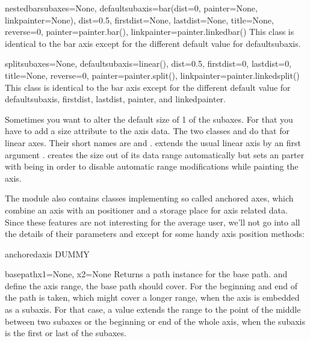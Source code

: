 \begin{classdesc}{nestedbar}{subaxes=None,
                             defaultsubaxis=bar(dist=0, painter=None, linkpainter=None),
                             dist=0.5, firstdist=None, lastdist=None,
                             title=None, reverse=0,
                             painter=painter.bar(),
                             linkpainter=painter.linkedbar()}
   This class is identical to the bar axis except for the different
   default value for defaultsubaxis.
\end{classdesc}

\begin{classdesc}{split}{subaxes=None,
                         defaultsubaxis=linear(),
                         dist=0.5, firstdist=0, lastdist=0,
                         title=None, reverse=0,
                         painter=painter.split(),
                         linkpainter=painter.linkedsplit()}
   This class is identical to the bar axis except for the different
   default value for defaultsubaxis, firstdist, lastdist, painter, and
   linkedpainter.
\end{classdesc}

Sometimes you want to alter the default size of 1 of the subaxes. For
that you have to add a size attribute to the axis data. The two
classes  and  do that for
linear axes. Their short names are  and
.  extends the usual linear
axis by an first argument .  creates
the size out of its data range automatically but sets an
 parter with  being  in
order to disable automatic range modifications while painting the
axis.

The  module also contains classes implementing so called
anchored axes, which combine an axis with an positioner and a storage
place for axis related data. Since these features are not interesting
for the average \PyX{} user, we'll not go into all the details of
their parameters and except for some handy axis position methods:

\begin{classdesc}{anchoredaxis}{}
  DUMMY
\end{classdesc}

\begin{methoddesc}{basepath}{x1=None, x2=None}
  Returns a path instance for the base path.  and 
  define the axis range, the base path should cover. For 
  the beginning and end of the path is taken, which might cover a
  longer range, when the axis is embedded as a subaxis. For that case,
  a  value extends the range to the point of the middle
  between two subaxes or the beginning or end of the whole axis, when
  the subaxis is the first or last of the subaxes.
\end{methoddesc}

